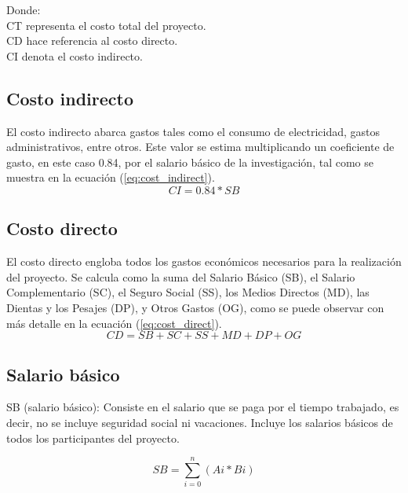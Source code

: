 Donde: \\
CT representa el costo total del proyecto. \\
CD hace referencia al costo directo. \\
CI denota el costo indirecto.

\subsection*{Costo indirecto}

El costo indirecto abarca gastos tales como el consumo de electricidad, gastos administrativos, entre otros.
Este valor se estima multiplicando un coeficiente de gasto, en este caso 0.84, por el salario básico de la
investigación, tal como se muestra en la ecuación (\ref{eq:cost_indirect}). \\

\begin{equation}
    \label{eq:cost_indirect}
    CI = 0.84 * SB
\end{equation}

\subsection*{Costo directo}

El costo directo engloba todos los gastos económicos necesarios para la realización del proyecto. Se
calcula como la suma del Salario Básico (SB), el Salario Complementario (SC), el Seguro Social (SS), los
Medios Directos (MD), las Dientas y los Pesajes (DP), y Otros Gastos (OG), como se puede observar con más
detalle en la ecuación (\ref{eq:cost_direct}). \\

\begin{equation}
    \label{eq:cost_direct}
    CD = SB + SC + SS + MD + DP + OG
\end{equation}

\subsection*{Salario básico}

SB (salario básico): Consiste en el salario que se paga por el tiempo trabajado, es decir, no se incluye seguridad social ni vacaciones. Incluye los salarios básicos de todos los participantes del proyecto.


\begin{equation}
    \label{eq:sal_basico}
    SB = \sum_{i = 0}^{n} (Ai * Bi)
\end{equation}

